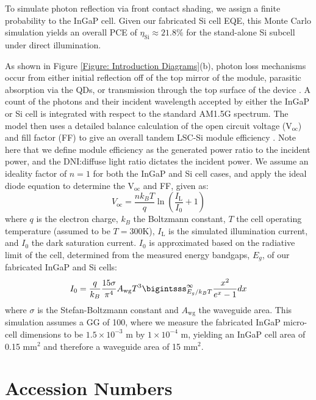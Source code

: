 \documentclass[conference]{./pvsctran}
\begin{document}
		To simulate photon reflection via front contact shading, we assign a finite probability to the InGaP cell.  Given our fabricated Si cell EQE, this Monte Carlo simulation yields an overall PCE of $\eta_\text{Si} \approx 21.8\%$ for the stand-alone Si subcell under direct illumination. 
		
		As shown in Figure \ref{Figure: Introduction Diagrams}(b), photon loss mechanisms occur from either initial reflection off of the top mirror of the module, parasitic absorption via the QDs, or transmission through the top surface of the device \cite{Rowan2008}.  A count of the photons and their incident wavelength accepted by either the InGaP or Si cell is integrated with respect to the standard AM1.5G spectrum. The model then uses a detailed balance calculation of the open circuit voltage (V$_\text{oc}$) and fill factor (FF) to give an overall tandem LSC-Si module efficiency \cite{Baruch1995, Levy2006, Rau2014, Shockley1961}.  Note here that we define module efficiency as the generated power ratio to the incident power, and the DNI:diffuse light ratio dictates the incident power. We assume an ideality factor of $n = 1$ for both the InGaP and Si cell cases, and apply the ideal diode equation to determine the V$_\text{oc}$ and FF, given as:
		\begin{equation} \label{Equation: Voc}
			V_\text{oc} = \frac{n k_B T}{q} \ln \left( \frac{I_\text{L}}{I_0} + 1 \right)
		\end{equation}
		where $q$ is the electron charge, $k_B$ the Boltzmann constant, $T$ the cell operating temperature (assumed to be $T=300$K), $I_\text{L}$ is the simulated illumination current, and $I_0$ the dark saturation current.  $I_0$ is approximated based on the radiative limit of the cell, determined from the measured energy bandgaps, $E_g$, of our fabricated InGaP and Si cells:
		\begin{equation}\label{Equation: I0}
			I_0 = \frac{q}{k_B} \frac{15\sigma}{\pi^4} A_\text{wg} T^3 \bigintsss_{E_g/k_BT}^{\infty} \frac{x^2}{e^x - 1} dx
		\end{equation}  
		where $\sigma$ is the Stefan-Boltzmann constant and $A_\text{wg}$ the waveguide area.  This simulation assumes a GG of 100, where we measure the fabricated InGaP micro-cell dimensions to be $1.5 \times 10^{-3}$ m by $1 \times 10^{-4}$ m, yielding an InGaP cell area of 0.15 mm$^2$ and therefore a waveguide area of 15 mm$^2$. 
	
	\section*{Accession Numbers}
	
\end{document}
